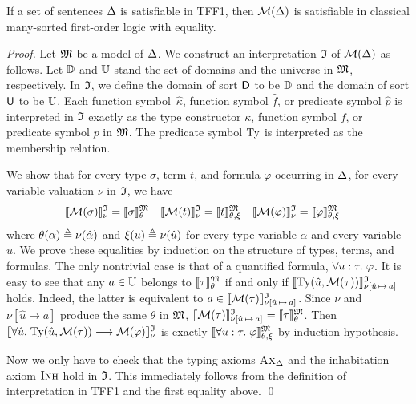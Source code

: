 \begin{theorem}%
\label{thm:mon_sound}%
\afterDot
If a set of sentences $\mathrm{\Delta}$ is satisfiable in TFF1,
then $\mathcal{M}(\mathrm{\Delta})$ is satisfiable in classical
many-sorted first-order logic with equality.
\end{theorem}
\begin{proof}
Let $\mathfrak{M}$ be a model of $\mathrm{\Delta}$.
We construct an interpretation $\mathfrak{I}$ of $\mathcal{M}(\mathrm{\Delta})$ as follows.
Let $\mathbb{D}$ and $\mathbb{U}$ stand
the set of domains and the universe in $\mathfrak{M}$, respectively.
In $\mathfrak{I}$, we define the domain of sort $\mathsf{D}$ to be $\mathbb{D}$
and the domain of sort $\mathsf{U}$ to be $\mathbb{U}$.
Each function symbol~$\hat{\kappa}$, function symbol $\hat{f}$,
or predicate symbol $\hat{p}$ is interpreted in $\mathfrak{I}$
exactly as the type constructor $\kappa$, function symbol $f$,
or predicate symbol $p$ in $\mathfrak{M}$.
The predicate symbol $\mathrm{Ty}$ is interpreted as the membership relation.

We show that for every type $\sigma$, term $t$,
and formula $\varphi$ occurring in $\mathrm{\Delta}$,
for every variable valuation $\nu$ in $\mathfrak{I}$, we have
\begin{align*}
\llbracket \mathcal{M}(\sigma) \rrbracket^{\mathfrak{I}}_{\nu} &= \llbracket \sigma \rrbracket^{\mathfrak{M}}_{\theta} &
\llbracket \mathcal{M}(t) \rrbracket^{\mathfrak{I}}_{\nu} &= \llbracket t \rrbracket^{\mathfrak{M}}_{\theta,\xi} &
\llbracket \mathcal{M}(\varphi) \rrbracket^{\mathfrak{I}}_{\nu} &= \llbracket \varphi \rrbracket^{\mathfrak{M}}_{\theta,\xi}
\end{align*}
where $\theta(\alpha) \mathrel{\triangleq} \nu(\hat{\alpha})$ and
$\xi(u) \mathrel{\triangleq} \nu(\hat{u})$ for every
type variable $\alpha$ and every variable $u$.
%
We prove these equalities by induction on the structure
of types, terms, and formulas. The only nontrivial case is
that of a quantified formula, $\forall u \mathrel{:} \tau .\; \varphi$.
It is easy to see that any $a \in \mathbb{U}$ belongs
to $\llbracket \tau \rrbracket^{\mathfrak{M}}_\theta$ if and only if
$\llbracket \mathrm{Ty}(\hat{u},\mathcal{M}(\tau)) \rrbracket^{\mathfrak{I}}_{\nu\smash{[\hat{u}\,\mapsto\,a]}}{}_{\vphantom{]}}$
holds. Indeed, the latter is equivalent to
$a \in \llbracket \mathcal{M}(\tau) \rrbracket^{\mathfrak{I}}_{\nu\smash{[\hat{u}\,\mapsto\,a]}}{}_{\vphantom{]}}$.
Since $\nu$ and $\nu[\hat{u} \mapsto a]$ produce the same
$\theta$ in $\mathfrak{M}$,
$\llbracket \mathcal{M}(\tau) \rrbracket^{\mathfrak{I}}_{\nu\smash{[\hat{u}\,\mapsto\,a]}}{}_{\vphantom{]}} =
\llbracket \tau \rrbracket^{\mathfrak{M}}_\theta$.
Then
$\llbracket \forall \hat{u} .\; \mathrm{Ty}(\hat{u},\mathcal{M}(\tau))
\longrightarrow \mathcal{M}(\varphi) \rrbracket^{\mathfrak{I}}_{\nu}$ is exactly
$\llbracket \forall u \mathrel{:} \tau .\; \varphi \rrbracket^{\mathfrak{M}}_{\theta,\xi}$
by induction hypothesis.

Now we only have to check that the typing axioms
$\text{\sc Ax}_{\mathrm{\Delta}}$ and the inhabitation axiom $\text{\sc Inh}$ hold in $\mathfrak{I}$.
This immediately follows from the definition of
interpretation in TFF1 and the first equality above.
\qed
\end{proof}

